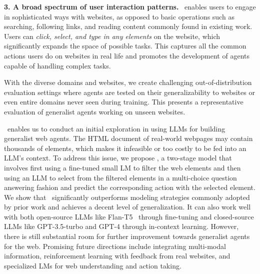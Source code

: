 \textbf{3. A broad spectrum of user interaction patterns.} \mind\ enables users to engage in sophisticated ways with websites, as opposed to basic operations such as searching, following links, and reading content commonly found in existing work. Users can \textit{click, select, and type in any elements} on the website, which significantly expands the space of possible tasks. This captures all the common actions users do on websites in real life and promotes the development of agents capable of handling complex tasks.

With the diverse domains and websites, we create challenging out-of-distribution evaluation settings where agents are tested on their generalizability to websites or even entire domains never seen during training.
This presents a representative evaluation of generalist agents working on unseen websites.

\mind\ enables us to conduct an initial exploration in using LLMs for building generalist web agents.
The HTML document of real-world webpages may contain thousands of elements, which makes it infeasible or too costly to be fed into an LLM's context. To address this issue, we propose \model, a two-stage model that involves first using a fine-tuned small LM to filter the web elements and then using an LLM to select from the filtered elements in a multi-choice question answering fashion and predict the corresponding action with the selected element.
We show that \model\ significantly outperforms modeling strategies commonly adopted by prior work and achieves a decent level of generalization.
It can also work well with both open-source LLMs like Flan-T5~\cite{flant5} through fine-tuning and closed-source LLMs like GPT-3.5-turbo and GPT-4 through in-context learning.
However, there is still substantial room for further improvement towards generalist agents for the web.
Promising future directions include integrating multi-modal information, reinforcement learning with feedback from real websites, and specialized LMs for web understanding and action taking.



